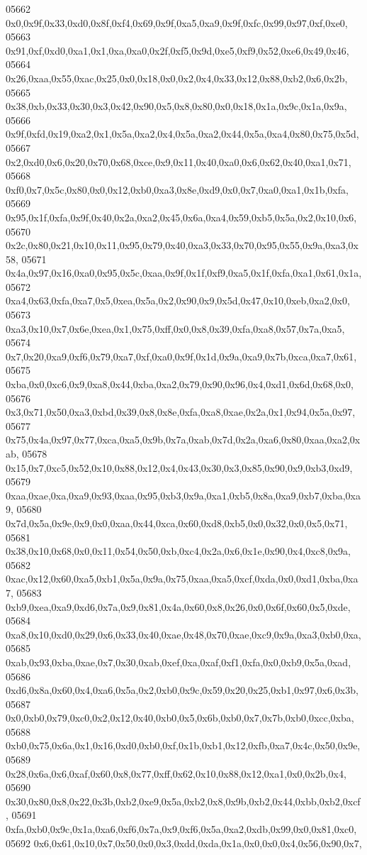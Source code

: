 \begin{DoxyCode}
05662   0x0,0x9f,0x33,0xd0,0x8f,0xf4,0x69,0x9f,0xa5,0xa9,0x9f,0xfc,0x99,0x97,0xf,0xe0,
05663   0x91,0xf,0xd0,0xa1,0x1,0xa,0xa0,0x2f,0xf5,0x9d,0xe5,0xf9,0x52,0xe6,0x49,0x46,
05664   0x26,0xaa,0x55,0xac,0x25,0x0,0x18,0x0,0x2,0x4,0x33,0x12,0x88,0xb2,0x6,0x2b,
05665   0x38,0xb,0x33,0x30,0x3,0x42,0x90,0x5,0x8,0x80,0x0,0x18,0x1a,0x9c,0x1a,0x9a,
05666   0x9f,0xfd,0x19,0xa2,0x1,0x5a,0xa2,0x4,0x5a,0xa2,0x44,0x5a,0xa4,0x80,0x75,0x5d,
05667   0x2,0xd0,0x6,0x20,0x70,0x68,0xce,0x9,0x11,0x40,0xa0,0x6,0x62,0x40,0xa1,0x71,
05668   0xf0,0x7,0x5c,0x80,0x0,0x12,0xb0,0xa3,0x8e,0xd9,0x0,0x7,0xa0,0xa1,0x1b,0xfa,
05669   0x95,0x1f,0xfa,0x9f,0x40,0x2a,0xa2,0x45,0x6a,0xa4,0x59,0xb5,0x5a,0x2,0x10,0x6,
05670   0x2c,0x80,0x21,0x10,0x11,0x95,0x79,0x40,0xa3,0x33,0x70,0x95,0x55,0x9a,0xa3,0x58,
05671   0x4a,0x97,0x16,0xa0,0x95,0x5c,0xaa,0x9f,0x1f,0xf9,0xa5,0x1f,0xfa,0xa1,0x61,0x1a,
05672   0xa4,0x63,0xfa,0xa7,0x5,0xea,0x5a,0x2,0x90,0x9,0x5d,0x47,0x10,0xeb,0xa2,0x0,
05673   0xa3,0x10,0x7,0x6e,0xea,0x1,0x75,0xff,0x0,0x8,0x39,0xfa,0xa8,0x57,0x7a,0xa5,
05674   0x7,0x20,0xa9,0xf6,0x79,0xa7,0xf,0xa0,0x9f,0x1d,0x9a,0xa9,0x7b,0xca,0xa7,0x61,
05675   0xba,0x0,0xc6,0x9,0xa8,0x44,0xba,0xa2,0x79,0x90,0x96,0x4,0xd1,0x6d,0x68,0x0,
05676   0x3,0x71,0x50,0xa3,0xbd,0x39,0x8,0x8e,0xfa,0xa8,0xae,0x2a,0x1,0x94,0x5a,0x97,
05677   0x75,0x4a,0x97,0x77,0xca,0xa5,0x9b,0x7a,0xab,0x7d,0x2a,0xa6,0x80,0xaa,0xa2,0xab,
05678   0x15,0x7,0xc5,0x52,0x10,0x88,0x12,0x4,0x43,0x30,0x3,0x85,0x90,0x9,0xb3,0xd9,
05679   0xaa,0xae,0xa,0xa9,0x93,0xaa,0x95,0xb3,0x9a,0xa1,0xb5,0x8a,0xa9,0xb7,0xba,0xa9,
05680   0x7d,0x5a,0x9e,0x9,0x0,0xaa,0x44,0xca,0x60,0xd8,0xb5,0x0,0x32,0x0,0x5,0x71,
05681   0x38,0x10,0x68,0x0,0x11,0x54,0x50,0xb,0xc4,0x2a,0x6,0x1e,0x90,0x4,0xc8,0x9a,
05682   0xac,0x12,0x60,0xa5,0xb1,0x5a,0x9a,0x75,0xaa,0xa5,0xcf,0xda,0x0,0xd1,0xba,0xa7,
05683   0xb9,0xea,0xa9,0xd6,0x7a,0x9,0x81,0x4a,0x60,0x8,0x26,0x0,0x6f,0x60,0x5,0xde,
05684   0xa8,0x10,0xd0,0x29,0x6,0x33,0x40,0xae,0x48,0x70,0xae,0xc9,0x9a,0xa3,0xb0,0xa,
05685   0xab,0x93,0xba,0xae,0x7,0x30,0xab,0xef,0xa,0xaf,0xf1,0xfa,0x0,0xb9,0x5a,0xad,
05686   0xd6,0x8a,0x60,0x4,0xa6,0x5a,0x2,0xb0,0x9c,0x59,0x20,0x25,0xb1,0x97,0x6,0x3b,
05687   0x0,0xb0,0x79,0xc0,0x2,0x12,0x40,0xb0,0x5,0x6b,0xb0,0x7,0x7b,0xb0,0xcc,0xba,
05688   0xb0,0x75,0x6a,0x1,0x16,0xd0,0xb0,0xf,0x1b,0xb1,0x12,0xfb,0xa7,0x4c,0x50,0x9e,
05689   0x28,0x6a,0x6,0xaf,0x60,0x8,0x77,0xff,0x62,0x10,0x88,0x12,0xa1,0x0,0x2b,0x4,
05690   0x30,0x80,0x8,0x22,0x3b,0xb2,0xe9,0x5a,0xb2,0x8,0x9b,0xb2,0x44,0xbb,0xb2,0xcf,
05691   0xfa,0xb0,0x9c,0x1a,0xa6,0xf6,0x7a,0x9,0xf6,0x5a,0xa2,0xdb,0x99,0x0,0x81,0xc0,
05692   0x6,0x61,0x10,0x7,0x50,0x0,0x3,0xdd,0xda,0x1a,0x0,0x0,0x4,0x56,0x90,0x7,

\end{DoxyCode}
